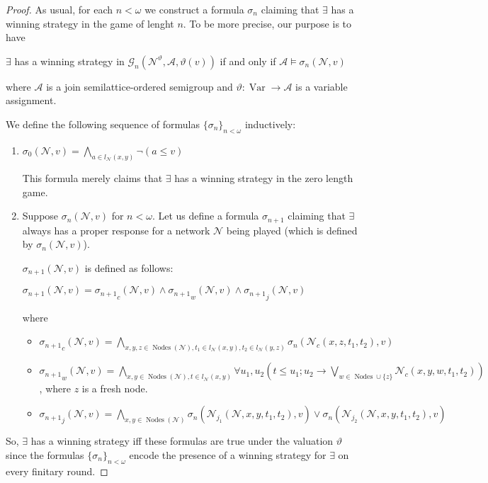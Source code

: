 \documentclass[a4paper]{article}
\theoremstyle{definition}
\theoremstyle{theorem}
\theoremstyle{proposition}
\theoremstyle{lemma}
\theoremstyle{ex}
\theoremstyle{corollary}
\theoremstyle{claim}
\begin{document}
\begin{proof}
  As usual, for each $n < \omega$ we construct a formula $\sigma_n$ claiming that $\exists$ has a winning strategy in the game of lenght $n$. To be more precise, our purpose is to have
  \begin{center}
    $\exists$ has a winning strategy in $\mathcal{G}_n(\mathcal{N}^{\vartheta}, \mathcal{A}, \vartheta(v))$ if and only if $\mathcal{A} \models \sigma_{n}(\mathcal{N}, v)$
  \end{center}
  where $\mathcal{A}$ is a join semilattice-ordered semigroup and $\vartheta : \operatorname{Var} \to \mathcal{A}$ is a variable assignment.

  We define the following sequence of formulas $\{ \sigma_n \}_{n < \omega}$ inductively:
  \begin{enumerate}
    \item $\sigma_0(\mathcal{N}, v) = \bigwedge \limits_{a \in l_{\mathcal{N}}(x, y)} \neg (a \leq v)$

This formula merely claims that $\exists$ has a winning strategy in the zero length game.

    \item Suppose $\sigma_{n}(\mathcal{N}, v)$ for $n < \omega$. Let us define a formula $\sigma_{n + 1}$ claiming that $\exists$ always has a proper response for a network $\mathcal{N}$ being played (which is defined by $\sigma_{n}(\mathcal{N}, v)$).

    $\sigma_{n + 1}(\mathcal{N}, v)$ is defined as follows:
    \begin{center}
      $\sigma_{n + 1}(\mathcal{N}, v) = {\sigma_{n + 1}}_c(\mathcal{N}, v) \land {\sigma_{n + 1}}_w(\mathcal{N}, v) \land {\sigma_{n + 1}}_j(\mathcal{N}, v)$
    \end{center}
    where
    \begin{itemize}
      \item ${\sigma_{n + 1}}_c(\mathcal{N}, v) = \bigwedge \limits_{x, y, z \in \operatorname{Nodes}(\mathcal{N}), t_1 \in l_{\mathcal{N}}(x, y), t_2 \in l_{\mathcal{N}}(y, z)} \sigma_{n}(\mathcal{N}_c(x, z, t_1, t_2), v)$
      \item ${\sigma_{n + 1}}_w(\mathcal{N}, v) = \bigwedge \limits_{x,y \in \operatorname{Nodes}(\mathcal{N}), t \in l_{\mathcal{N}}(x,y)} \forall u_1, u_2 (t \leq u_1 ; u_2 \rightarrow \bigvee \limits_{w \in \operatorname{Nodes} \cup \{ z \}} \mathcal{N}_c(x,y,w, t_1, t_2))$, where $z$ is a fresh node.
      \item ${\sigma_{n + 1}}_j(\mathcal{N}, v) = \bigwedge \limits_{x, y \in \operatorname{Nodes}(\mathcal{N})} \sigma_{n}(\mathcal{N}_{j_1}(\mathcal{N}, x, y, t_1, t_2), v) \lor \sigma_{n}(\mathcal{N}_{j_2}(\mathcal{N}, x, y, t_1, t_2), v)$
    \end{itemize}
  \end{enumerate}

  So, $\exists$ has a winning strategy iff these formulas are true under the valuation $\vartheta$ since the formulas $\{ \sigma_n \}_{n < \omega}$ encode the presence of a winning strategy for $\exists$ on every finitary round.
\end{proof}
\end{document}

